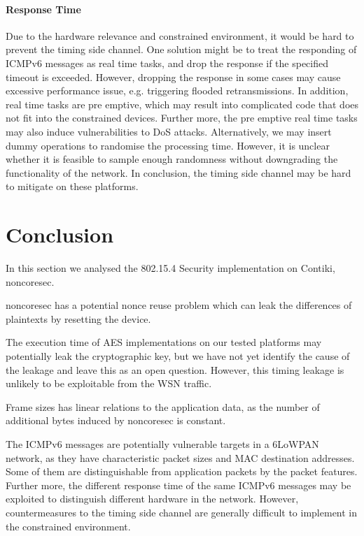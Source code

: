 \paragraph{Response Time}

Due to the hardware relevance and constrained environment, it would be hard to prevent the timing side channel. One solution might be to treat the responding of ICMPv6 messages as real time tasks, and drop the response if the specified timeout is exceeded. However, dropping the response in some cases may cause excessive performance issue, e.g. triggering flooded retransmissions. In addition, real time tasks are pre emptive, which may result into complicated code that does not fit into the constrained devices. Further more, the pre emptive real time tasks may also induce vulnerabilities to DoS attacks. Alternatively, we may insert dummy operations to randomise the processing time. However, it is unclear whether it is feasible to sample enough randomness without downgrading the functionality of the network. In conclusion, the timing side channel may be hard to mitigate on these platforms.


\section{Conclusion}

In this section we analysed the 802.15.4 Security implementation on Contiki, noncoresec.

noncoresec has a potential nonce reuse problem which can leak the differences of plaintexts by resetting the device.

The execution time of AES implementations on our tested platforms may potentially leak the cryptographic key, but we have not yet identify the cause of the leakage and leave this as an open question. However, this timing leakage is unlikely to be exploitable from the WSN traffic.

Frame sizes has linear relations to the application data, as the number of additional bytes induced by noncoresec is constant.

The ICMPv6 messages are potentially vulnerable targets in a 6LoWPAN network, as they have characteristic packet sizes and MAC destination addresses. Some of them are distinguishable from application packets by the packet features. Further more, the different response time of the same ICMPv6 messages may be exploited to distinguish different hardware in the network. However, countermeasures to the timing side channel are generally difficult to implement in the constrained environment.

